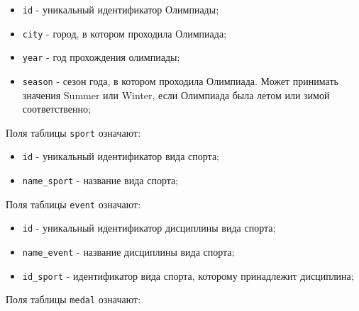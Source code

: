 \begin{itemize}
	
	\item  \texttt{id} - уникальный идентификатор Олимпиады;
	
	\item  \texttt{city} - город, в котором проходила Олимпиада;
	
	\item  \texttt{year} - год прохождения олимпиады;
	
	\item  \texttt{season} - сезон года, в котором проходила Олимпиада. 
	Может принимать значения Summer или Winter, если Олимпиада была летом или зимой соответственно;
	
\end{itemize}

Поля таблицы \texttt{sport} означают:

\begin{itemize}
	
	\item  \texttt{id} - уникальный идентификатор вида спорта;
	
	\item  \texttt{name\_sport} - название вида спорта;
	
\end{itemize}

Поля таблицы \texttt{event} означают:

\begin{itemize}
	
	\item  \texttt{id} - уникальный идентификатор дисциплины вида спорта;
	
	\item  \texttt{name\_event} - название дисциплины вида спорта;
	
	\item  \texttt{id\_sport} - идентификатор вида спорта, которому принадлежит дисциплина;
	
\end{itemize}

Поля таблицы \texttt{medal} означают:

